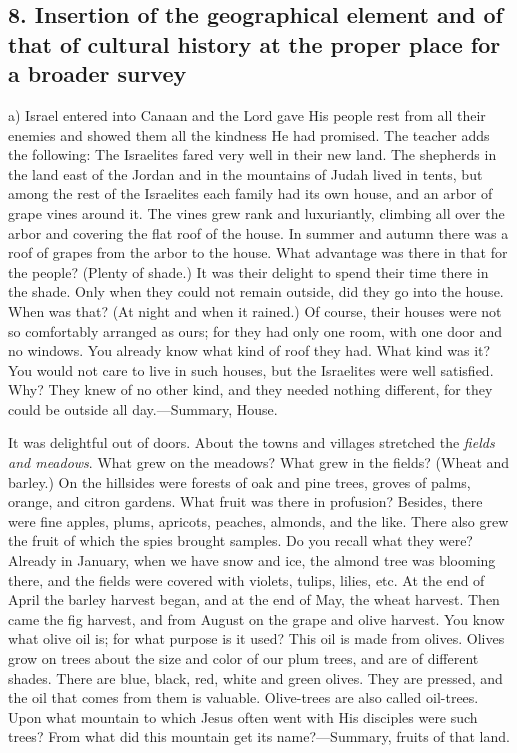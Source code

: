 \subsection[8. Insertion of the geographical element]{8. Insertion of the geographical element and of that of cultural history at the proper place for a broader survey}

a) Israel entered into Canaan and the Lord gave His people rest from all their enemies and showed them all the kindness He had promised. The teacher adds the following: The Israelites fared very well in their new land. The shepherds in the land east of the Jordan and in the
mountains of Judah lived in tents, but among the rest of the Israelites each family had its own house, and an arbor of grape vines around it. The vines grew rank and luxuriantly, climbing all over the arbor and covering the flat roof of the house. In summer and autumn there was a roof of grapes from the arbor to the house. What advantage was there in that for the people? (Plenty of shade.) It was their delight to spend their time there in the shade. Only when they could not remain outside, did they go into the house. When was that? (At night and when it rained.) Of course, their houses were not so comfortably arranged as ours; for they had only one room, with one door and no windows. You already know what kind of roof they had. What kind was it? You would not care to live in such houses, but the Israelites were well satisfied. Why? They knew of no other kind, and they needed nothing different, for they could be outside all day.—Summary, House.

It was delightful out of doors. About the towns and villages stretched the \emph{fields and meadows}. What grew on the meadows? What grew in the fields? (Wheat and barley.) On the hillsides were forests of oak and pine trees, groves of palms, orange, and citron gardens. What fruit was there in profusion? Besides, there were fine apples, plums, apricots, peaches, almonds, and the like. There also grew the fruit of which the spies brought samples. Do you recall what they were? Already in January, when we have snow and ice, the almond tree was blooming there, and the fields were covered with violets, tulips, lilies, etc. At the end of April the barley harvest began, and at the end of May, the wheat harvest. Then came the fig harvest, and from August on the grape and olive harvest. You know what olive oil is; for what purpose is it used? This oil is made from olives. Olives grow on trees about the size and color of our plum trees, and are of different shades. There are blue, black, red, white and green olives. They are pressed, and the oil that comes from them is valuable. Olive-trees are also called oil-trees. Upon what mountain to which Jesus often went with His disciples were such trees? From what did this mountain get its name?—Summary, fruits of that land.

